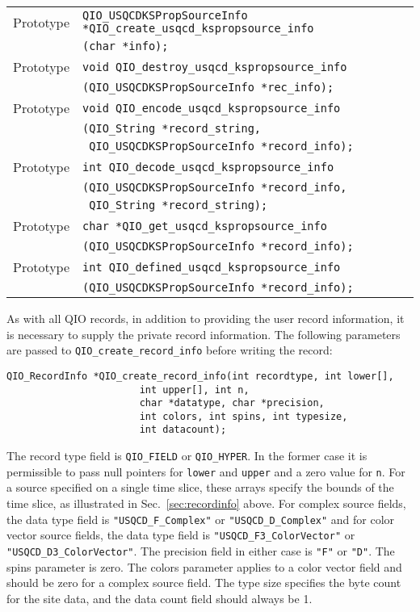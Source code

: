 \documentclass{article}
\begin{document}
\begin{flushleft}
  \begin{tabular}{|l|l|}
  \hline
Prototype      & \verb|QIO_USQCDKSPropSourceInfo *QIO_create_usqcd_kspropsource_info|\\
               & \verb|(char *info);|\\
Prototype      & \verb|void QIO_destroy_usqcd_kspropsource_info|\\
               & \verb|(QIO_USQCDKSPropSourceInfo *rec_info);|\\
Prototype      & \verb|void QIO_encode_usqcd_kspropsource_info|\\
               & \verb|(QIO_String *record_string, |\\
               & \verb| QIO_USQCDKSPropSourceInfo *record_info);|\\
Prototype      & \verb|int QIO_decode_usqcd_kspropsource_info|\\
               & \verb|(QIO_USQCDKSPropSourceInfo *record_info,|\\
               & \verb| QIO_String *record_string);|\\
Prototype      & \verb|char *QIO_get_usqcd_kspropsource_info|\\
               & \verb|(QIO_USQCDKSPropSourceInfo *record_info);|\\
Prototype      & \verb|int QIO_defined_usqcd_kspropsource_info|\\
               & \verb|(QIO_USQCDKSPropSourceInfo *record_info);|\\
 \hline
 \end{tabular}
\end{flushleft}
%

As with all QIO records, in addition to providing the user record
information, it is necessary to supply the private record information.
The following parameters are passed to \verb|QIO_create_record_info|
before writing the record:
%
\begin{verbatim}
QIO_RecordInfo *QIO_create_record_info(int recordtype, int lower[],
				       int upper[], int n,
				       char *datatype, char *precision, 
				       int colors, int spins, int typesize, 
				       int datacount);
\end{verbatim}
%
The record type field is \verb|QIO_FIELD| or \verb|QIO_HYPER|. In the
former case it is permissible to pass null pointers for \verb|lower|
and \verb|upper| and a zero value for \verb|n|.  For a source
specified on a single time slice, these arrays specify the bounds of
the time slice, as illustrated in Sec.~\ref{sec:recordinfo} above.
For complex source fields, the data type field is
\verb|"USQCD_F_Complex"| or \verb|"USQCD_D_Complex"| and for color
vector source fields, the data type field is
\verb|"USQCD_F3_ColorVector"| or \verb|"USQCD_D3_ColorVector"|.  The
precision field in either case is \verb|"F"| or \verb|"D"|.  The spins
parameter is zero. The colors parameter applies to a color vector
field and should be zero for a complex source field.  The type size
specifies the byte count for the site data, and the data count field
should always be 1.
\end{document}
